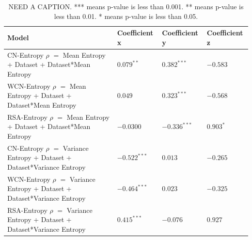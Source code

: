 \documentclass[12pt]{article}
\begin{document}
\begin{center}
	\begin{table}[H]
	\begin{tabular}{ | p{5.0cm} | p{3cm} | p{3cm} | p{3cm} | }
	\hline
	Model & Coefficient x  & Coefficient y & Coefficient z \\	
	\hline
	CN-Entropy $\rho$ $ = $ Mean Entropy + Dataset + Dataset*Mean Entropy & $0.079 ^{**}$ & $0.382^{***}$  & $-0.583$ \\	
	\hline
	WCN-Entropy $\rho$ $ = $ Mean Entropy + Dataset + Dataset*Mean Entropy & $0.049$ & $0.323^{***}$ & $-0.568$  \\	
	\hline

	RSA-Entropy $\rho$ $ = $ Mean Entropy + Dataset + Dataset*Mean Entropy &  $-0.0300$ & $-0.336^{***}$ & $0.903^{*}$ \\	

	\hline
	CN-Entropy $\rho$ $ = $ Variance Entropy + Dataset + Dataset*Variance Entropy & $-0.522^{***}$ &  $0.013$ & $-0.265$ \\	
	\hline
	WCN-Entropy $\rho$ $ = $ Variance Entropy + Dataset + Dataset*Variance Entropy & $-0.464^{***}$ &  $0.023$ & $-0.325$ \\	
	\hline
	RSA-Entropy $\rho$ $ = $ Variance Entropy + Dataset + Dataset*Variance Entropy & $0.415^{***}$ & $-0.076$ & $0.927$ \\	

	\hline
	\end{tabular}
	\caption{NEED A CAPTION. *** means p-value is less than 0.001. ** means p-value is less than 0.01.  * means p-value is less than 0.05. }
	\label{table:rate_stats}
	\end{table}
\end{center}
\end{document}
